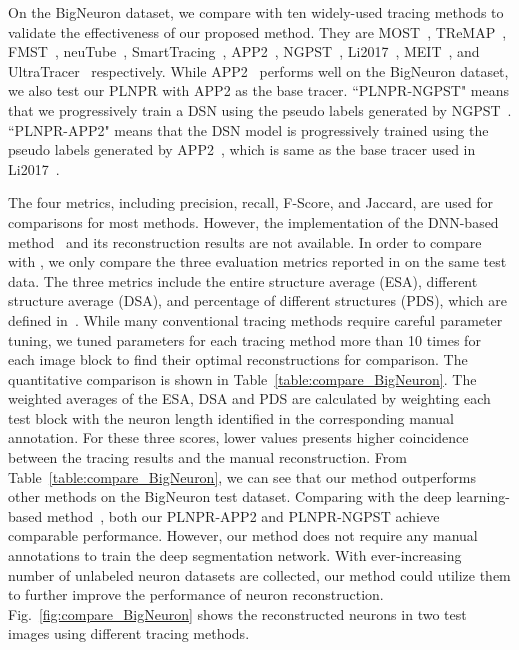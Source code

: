 On the BigNeuron dataset, we compare with ten widely-used tracing methods to validate the effectiveness of our proposed method.
They are MOST~\cite{Wu2014}, TReMAP~\cite{Zhou2016}, FMST~\cite{Yang2019}, neuTube~\cite{Feng2015}, SmartTracing~\cite{Chen2015}, APP2~\cite{Xiao2013}, NGPST~\cite{Quan2015}, Li2017~\cite{Li2017}, MEIT~\cite{Wang2018}, and UltraTracer~\cite{Peng2017} respectively.
%
While APP2~\cite{Xiao2013} performs well on the BigNeuron dataset, we also test our PLNPR with APP2 as the base tracer. 
``PLNPR-NGPST" means that we progressively train a DSN using the pseudo labels generated by NGPST~\cite{Quan2015}.
``PLNPR-APP2" means that the DSN model is progressively trained using the pseudo labels generated by APP2~\cite{Xiao2013}, which is same as the base tracer used in Li2017~\cite{Li2017}.



The four metrics, including precision, recall, F-Score, and Jaccard, are used for comparisons for most methods.
However, the implementation of the DNN-based method~\cite{Li2017} and its reconstruction results are not available.
In order to compare with \cite{Li2017}, we only compare the three evaluation metrics reported in \cite{Li2017} on the same test data.
%
The three metrics include the entire structure average (ESA), different structure average (DSA), and percentage of different structures (PDS), which are defined in~\cite{Peng2010a}.
While many conventional tracing methods require careful parameter tuning, we tuned parameters for each tracing method more than 10 times for each image block to find their optimal reconstructions for comparison.
%
The quantitative comparison is shown in Table~\ref{table:compare_BigNeuron}.
The weighted averages of the ESA, DSA and PDS are calculated by weighting each test block with the neuron length identified in the corresponding manual annotation.
For these three scores, lower values presents higher coincidence between the tracing results and the manual reconstruction.
%
From Table~\ref{table:compare_BigNeuron}, we can see that our method outperforms other methods on the BigNeuron test dataset.
%
Comparing with the deep learning-based method~\cite{Li2017}, both our PLNPR-APP2 and PLNPR-NGPST achieve comparable performance.
However, our method does not require any manual annotations to train the deep segmentation network.
With ever-increasing number of unlabeled neuron datasets are collected, our method could utilize them to further improve the performance of neuron reconstruction.
%
Fig.~\ref{fig:compare_BigNeuron} shows the reconstructed neurons in two test images using different tracing methods. 


